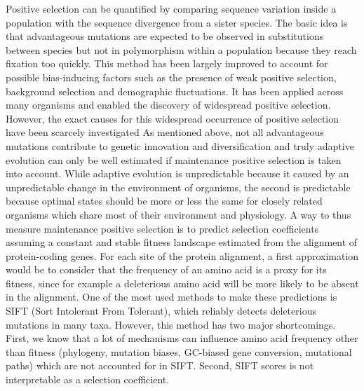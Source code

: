 \documentclass{article}
\newcommand{\NS}[1]{\textcolor{red}{\textbf{\emph{[NS: #1]}}}}
\begin{document}
    Positive selection can be quantified by comparing sequence variation inside a population with the sequence divergence from a sister species\cite{mcdonald_adaptative_1991}.
    The basic idea is that advantageous mutations are expected to be observed in substitutions between species but not in polymorphism within a population because they reach fixation too quickly.
    This method has been largely improved to account for possible bias-inducing factors such as the presence of weak positive selection, background selection and demographic fluctuations\cite{eyre-walker_distribution_2006, eyre-walker_estimating_2009, galtier_adaptive_2016, tataru_inference_2017}.
    It has been applied across many organisms and enabled the discovery of widespread positive selection\cite{moutinho_variation_2019}.
    However, the exact causes for this widespread occurrence of positive selection have been scarcely investigated\cite{eyre-walker_distribution_2006, eyre-walker_estimating_2009, galtier_adaptive_2016} %
    As mentioned above, not all advantageous mutations contribute to genetic innovation and diversification and truly adaptive evolution can only be well estimated if maintenance positive selection is taken into account.
    While adaptive evolution is unpredictable because it caused by an unpredictable change in the environment of organisms, the second is predictable because optimal states should be more or less the same for closely related organisms which share most of their environment and physiology.
    A way to thus measure maintenance positive selection is to predict selection coefficients assuming a constant and stable fitness landscape estimated from the alignment of protein-coding genes.
    For each site of the protein alignment, a first approximation would be to consider that the frequency of an amino acid is a proxy for its fitness, since for example a deleterious amino acid will be more likely to be absent in the alignment.
    One of the most used methods to make these predictions is SIFT (Sort Intolerant From Tolerant), which reliably detects deleterious mutations in many taxa\cite{ng_sift_2003, vaser_sift_2016}.
    However, this method has two major shortcomings.
    First, we know that a lot of mechanisms can influence amino acid frequency other than fitness (phylogeny, mutation biases, GC-biased gene conversion, mutational paths) which are not accounted for in SIFT\@.
    Second, SIFT scores is not interpretable as a selection coefficient.
\end{document}
